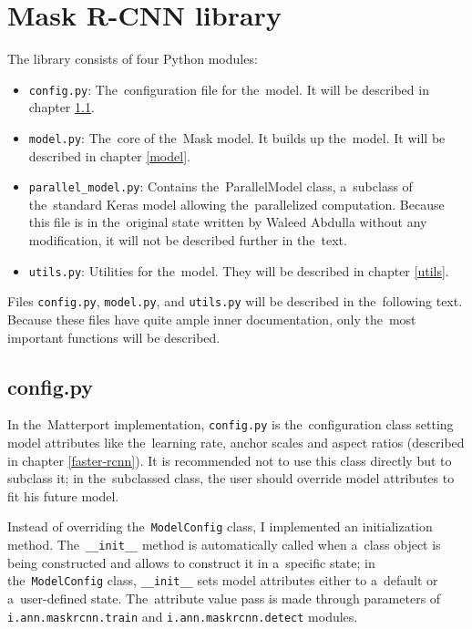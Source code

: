 \section{Mask R-CNN library}
\label{library}

The library consists of four Python modules:
\begin{itemize}
	 \item \verb|config.py|: The~configuration file for the~model. It will be
	 described in chapter \ref{config}.
	 \item \verb|model.py|: The~core of the~Mask  model. It builds up
	 the~model. It will be described in chapter \ref{model}.
	 \item \verb|parallel_model.py|: Contains the~ParallelModel class, a~subclass
	 of the~standard Keras model allowing the~parallelized computation. Because
	 this file is in the~original state written by Waleed Abdulla without any
	 modification, it will not be described further in the~text.
	 \item \verb|utils.py|: Utilities for the~model. They will be described in
	 chapter \ref{utils}.
\end{itemize}

Files \verb|config.py|, \verb|model.py|, and \verb|utils.py| will be described 
in the~following text. Because these files have quite ample inner documentation, 
only the~most important functions will be described.

\subsection{config.py}
\label{config}

In the~Matterport implementation, \verb|config.py| is the~configuration class 
setting model attributes like the~learning rate,  anchor scales and 
aspect ratios (described in chapter \ref{faster-rcnn}). It is recommended not to 
use this class directly but to subclass it; in the~subclassed class, the user should 
override model attributes to fit his future model.

Instead of overriding the~\verb|ModelConfig| class, I implemented an 
initialization method. The~\verb|__init__| method is automatically called when
a~class object is being constructed and allows to construct it in a~specific 
state; in the~\verb|ModelConfig| class, \verb|__init__| sets model attributes 
either to a~default or a~user-defined state. The~attribute value pass is made 
through parameters of \verb|i.ann.maskrcnn.train| and \verb|i.ann.maskrcnn.detect| 
modules.

